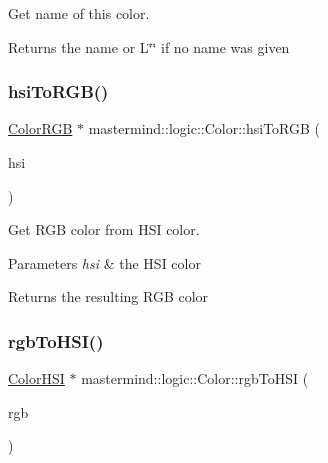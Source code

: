 Get name of this color. 

\begin{DoxyReturn}{Returns}
the name or {\ttfamily L\char`\"{}\char`\"{}} if no name was given 
\end{DoxyReturn}
\hypertarget{classmastermind_1_1logic_1_1_color_abdfea9c0cb5c82afd84c96422a520655}{}\label{classmastermind_1_1logic_1_1_color_abdfea9c0cb5c82afd84c96422a520655} 
\subsubsection{\texorpdfstring{hsi\+To\+R\+G\+B()}{hsiToRGB()}}
{\footnotesize\ttfamily \hyperlink{classmastermind_1_1logic_1_1_color_r_g_b}{Color\+R\+GB} $\ast$ mastermind\+::logic\+::\+Color\+::hsi\+To\+R\+GB (\begin{DoxyParamCaption}\item[{const \hyperlink{classmastermind_1_1logic_1_1_color_h_s_i}{Color\+H\+SI} \&}]{hsi }\end{DoxyParamCaption})\hspace{0.3cm}{\ttfamily [static]}}

Get R\+GB color from H\+SI color. 
\begin{DoxyParams}{Parameters}
{\em hsi} & the H\+SI color \\
\hline
\end{DoxyParams}
\begin{DoxyReturn}{Returns}
the resulting R\+GB color 
\end{DoxyReturn}
\hypertarget{classmastermind_1_1logic_1_1_color_a8a5e0010371827813a79b778af116bdb}{}\label{classmastermind_1_1logic_1_1_color_a8a5e0010371827813a79b778af116bdb} 
\subsubsection{\texorpdfstring{rgb\+To\+H\+S\+I()}{rgbToHSI()}}
{\footnotesize\ttfamily \hyperlink{classmastermind_1_1logic_1_1_color_h_s_i}{Color\+H\+SI} $\ast$ mastermind\+::logic\+::\+Color\+::rgb\+To\+H\+SI (\begin{DoxyParamCaption}\item[{const \hyperlink{classmastermind_1_1logic_1_1_color_r_g_b}{Color\+R\+GB} \&}]{rgb }\end{DoxyParamCaption})\hspace{0.3cm}{\ttfamily [static]}}

